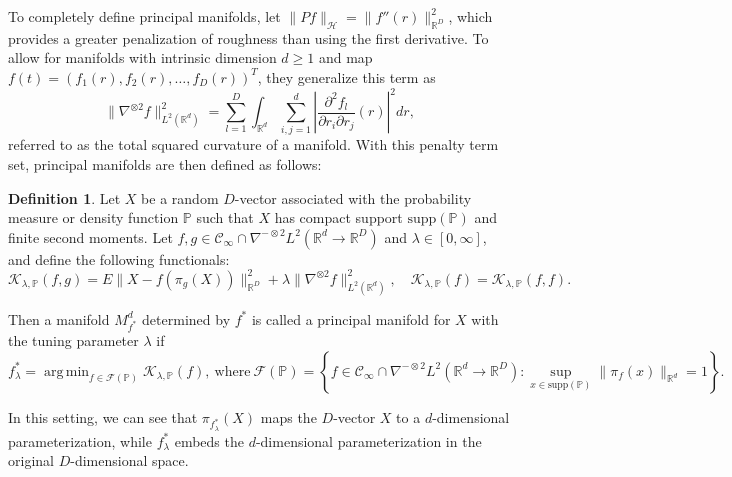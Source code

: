 \documentclass[11pt,reqno]{article}
\DeclareMathOperator*{\argmin}{arg\,min}
\theoremstyle{definition}
\newtheorem{definition}{Definition}
\begin{document}
To completely define principal manifolds, \cite{mengPrincipalManifoldEstimation2021} let $\|Pf\|_{\mathcal{H}} = \|f''(r)\|_{\mathbb{R}^{D}}^2$, which provides a greater penalization of roughness than using the first derivative. To allow for manifolds with intrinsic dimension $d \geq 1$ and map $f(t) = \left(f_1(r), f_2(r), \dots, f_D(r)\right)^{T}$, they generalize this term as
\[%
  \|\nabla^{\otimes 2}f\|_{L^2(\mathbb{R}^{d})}^2 = \sum_{l=1}^{D} \int_{\mathbb{R}^{d}}\sum_{i, j = 1}^{d}\left|\frac{\partial^2f_l}{\partial r_i \partial r_j}(r)\right|^2dr
,\]%
referred to as the total squared curvature of a manifold. With this penalty term set, principal manifolds are then defined as follows:
\begin{definition}
  \label{def:principal_manifolds}
  Let $X$ be a random $D$-vector associated with the probability measure or density function $\mathbb{P}$ such that $X$ has compact support $\text{supp}(\mathbb{P})$ and finite second moments. Let $f, g \in \mathcal{C}_{\infty}\cap \nabla^{-\otimes 2}L^2(\mathbb{R}^{d} \to \mathbb{R}^{D})$ and $\lambda \in [0, \infty]$, and define the following functionals:
  \[%
    \mathcal{K}_{\lambda, \mathbb{P}}(f, g) = E\|X - f(\pi_g(X))\|_{\mathbb{R}^{D}}^2 + \lambda\|\nabla^{\otimes 2}f\|_{L^2(\mathbb{R}^{d})}^2, \quad \mathcal{K}_{\lambda, \mathbb{P}}(f) = \mathcal{K}_{\lambda, \mathbb{P}}(f, f)
  .\]%

  Then a manifold $M_{f^{*}}^{d}$ determined by $f^{*}$ is called a principal manifold for $X$ with the tuning parameter $\lambda$ if 
  \[%
    f_{\lambda}^{*} = \argmin_{f \in \mathcal{F}(\mathbb{P})}\mathcal{K}_{\lambda, \mathbb{P}}(f), \ \text{where} \ \mathcal{F}(\mathbb{P}) = \left\{f \in \mathcal{C}_{\infty} \cap \nabla^{-\otimes 2}L^2(\mathbb{R}^{d} \to \mathbb{R}^{D}): \sup_{x \in \text{supp}(\mathbb{P})}\|\pi_f(x)\|_{\mathbb{R}^{d}} = 1\right\}
  .\]%
\end{definition}

In this setting, we can see that $\pi_{f_{\lambda}^{*}}(X)$ maps the $D$-vector $X$ to a $d$-dimensional parameterization, while $f_{\lambda}^{*}$ embeds the $d$-dimensional parameterization in the original $D$-dimensional space.
\end{document}
